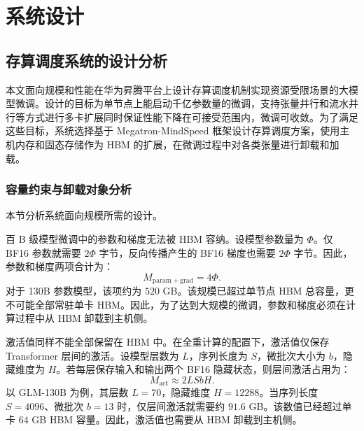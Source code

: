 \documentclass[bachelor,openany,oneside,color,AutoFakeBold=true]{buaathesis}
\begin{document}


\chapter{系统设计}



\section{存算调度系统的设计分析}

本文面向规模和性能在华为昇腾平台上设计存算调度机制实现资源受限场景的大模型微调。设计的目标为单节点上能启动千亿参数量的微调，支持张量并行和流水并行等方式进行多卡扩展同时保证性能下降在可接受范围内，微调可收敛。为了满足这些目标，系统选择基于 Megatron-MindSpeed 框架设计存算调度方案，使用主机内存和固态存储作为 HBM 的扩展，在微调过程中对各类张量进行卸载和加载。

\subsection{容量约束与卸载对象分析}

本节分析系统面向规模所需的设计。

百 B 级模型微调中的参数和梯度无法被 HBM 容纳。设模型参数量为 $\Phi$。仅 BF16 参数就需要 $2\Phi$ 字节，反向传播产生的 BF16 梯度也需要 $2\Phi$ 字节。因此，参数和梯度两项合计为：
\[
M_{\mathrm{param+grad}} = 4\Phi .
\]
对于 130B 参数模型，该项约为 $520$ GB。该规模已超过单节点 HBM 总容量，更不可能全部常驻单卡 HBM。因此，为了达到大规模的微调，参数和梯度必须在计算过程中从 HBM 卸载到主机侧。

激活值同样不能全部保留在 HBM 中。在全重计算的配置下，激活值仅保存 Transformer 层间的激活。设模型层数为 $L$，序列长度为 $S$，微批次大小为 $b$，隐藏维度为 $H$。若每层保存输入和输出两个 BF16 隐藏状态，则层间激活占用为：
\[
M_{\mathrm{act}} \approx 2LSbH .
\]
以 GLM-130B 为例，其层数 $L=70$，隐藏维度 $H=12288$。当序列长度 $S=4096$、微批次 $b=13$ 时，仅层间激活就需要约 $91.6$ GB。该数值已经超过单卡 $64$ GB HBM 容量。因此，激活值也需要从 HBM 卸载到主机侧。
\end{document}
